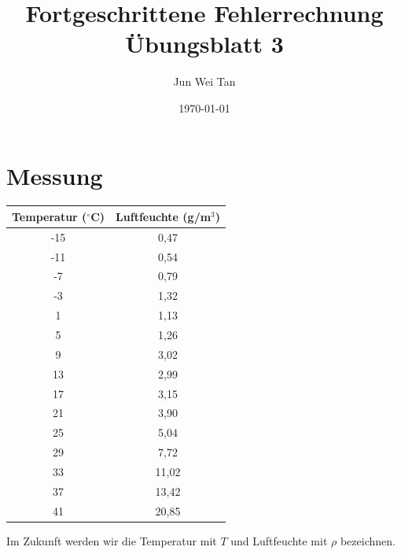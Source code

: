 \documentclass[prb,12pt]{revtex4-2}
\theoremstyle{definition}
\theoremstyle{definition}
\begin{document}
\title{Fortgeschrittene Fehlerrechnung Übungsblatt 3}
	\author{Jun Wei Tan}
	\date{\today}
	\maketitle

\section{Messung}
\begin{center}
\begin{tabular}{cc}
	\toprule
	\textbf{Temperatur ($^{\circ}$C)} & \textbf{Luftfeuchte (g/m$^3$)} \\\midrule 
-15 & 0,47 \\\midrule
-11 & 0,54 \\\midrule
-7 & 0,79 \\\midrule
-3 & 1,32 \\\midrule
1 & 1,13 \\\midrule
5 & 1,26 \\\midrule
9 & 3,02 \\\midrule
13 & 2,99 \\\midrule
17 & 3,15 \\\midrule
21 & 3,90 \\\midrule
25 & 5,04 \\\midrule
29 & 7,72 \\\midrule
33 & 11,02 \\\midrule
37 & 13,42 \\\midrule
41 & 20,85 \\\bottomrule
\end{tabular}
\end{center}
Im Zukunft werden wir die Temperatur mit $T$ und Luftfeuchte mit $\rho$ bezeichnen.
\end{document}

